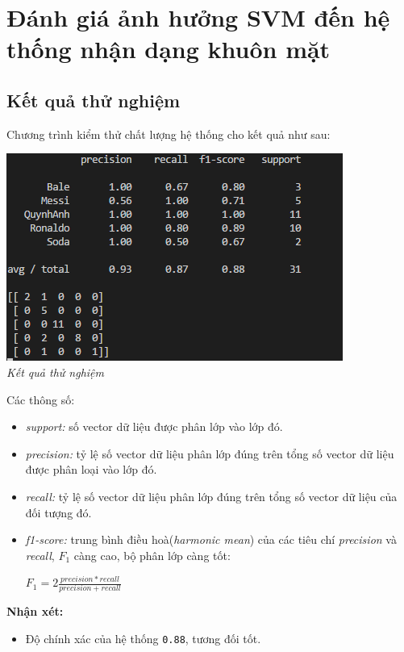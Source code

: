 \documentclass[12pt,a4paper]{article}
\begin{document}
\section{Đánh giá ảnh hưởng SVM đến hệ thống nhận dạng khuôn mặt}
\subsection{Kết quả thử nghiệm}
Chương trình kiểm thử chất lượng hệ thống cho kết quả như sau:\par  
\begin{center}
\includegraphics[scale=0.9]{11.png}\\
\textit{Kết quả thử nghiệm}\\
\end{center}
Các thông số: \par 
\begin{itemize}
\item \textit{support:} số vector dữ liệu được phân lớp vào lớp đó. 
\item \textit{precision:} tỷ lệ số vector dữ liệu phân lớp đúng trên tổng số vector dữ liệu được phân loại vào lớp đó.
\item \textit{recall:} tỷ lệ số vector dữ liệu phân lớp đúng trên tổng số vector dữ liệu của đối tượng đó.
\item \textit{f1-score:} trung bình điều hoà(\textit{harmonic mean}) của các tiêu chí \textit{precision} và \textit{recall}, $\mathit{F_1}$ càng cao, bộ phân lớp càng tốt: \par 
\begin{center}
{\fontsize{18pt}{1}\selectfont $\mathit{F_1 = 2\frac{precision*recall}{precision+recall} }$}\\
\end{center}  
\end{itemize} 
 
\noindent \textbf{Nhận xét:}
\begin{itemize}
\item Độ chính xác của hệ thống \texttt{0.88}, tương đối tốt. 
\end{itemize}
\end{document}
